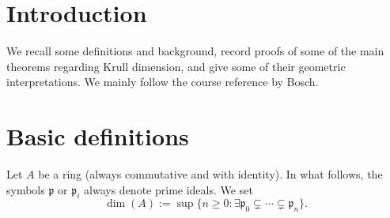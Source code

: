 \documentclass[reqno]{amsart} 
\begin{document}
\section{Introduction}
\label{sec:org2573665}

We recall some definitions and background, record proofs of some
of the main theorems regarding Krull dimension, and give some of
their geometric interpretations.
We mainly follow the course reference by Bosch.

\section{Basic definitions}
\label{sec:orgdb2d3a0}

Let \(A\) be a ring (always commutative and with identity).
In what follows,
the symbols \(\mathfrak{p}\) or \(\mathfrak{p}_i\)
always denote prime ideals.
We set
\[
    \dim(A) :=
    \sup \{n \geq 0 : \exists \mathfrak{p}_0 \subsetneq \dotsb \subsetneq \mathfrak{p}_n \}.
  \]
\end{document}

